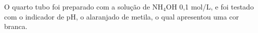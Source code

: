 \begin{figure}[h]
            \label{fig:experimento12}
        \end{figure}

        \newpage

        \indent O quarto tubo foi preparado com a solução de NH$_4$OH 0,1 mol/L, e foi testado com o indicador de pH, o alaranjado de metila, o qual apresentou uma cor branca.

